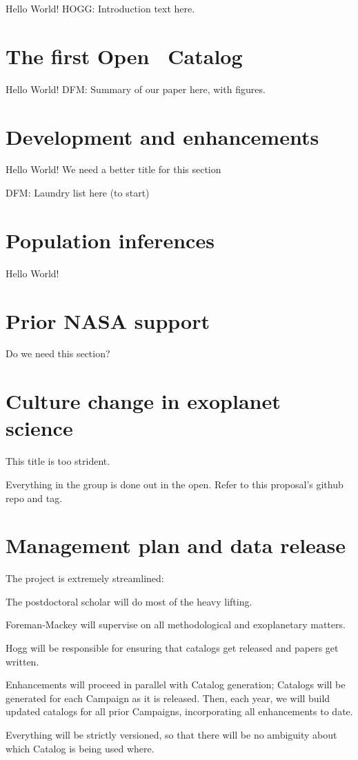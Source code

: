 \documentclass[12pt]{article}
\begin{document}
Hello World!  HOGG:  Introduction text here.

\section{The first Open \ketu\ Catalog}

Hello World!  DFM:  Summary of our paper here, with figures.

\section{Development and enhancements}

Hello World!  We need a better title for this section

DFM:  Laundry list here (to start)

\section{Population inferences}

Hello World!

\section{Prior NASA support}

Do we need this section?

\section{Culture change in exoplanet science}

This title is too strident.

Everything in the group is done out in the open.
Refer to this proposal's github repo and tag.

\section{Management plan and data release}

The project is extremely streamlined:

The postdoctoral scholar will do most of the heavy lifting.

Foreman-Mackey will supervise on all methodological and exoplanetary
matters.

Hogg will be responsible for ensuring that catalogs get released and
papers get written.

Enhancements will proceed in parallel with Catalog generation;
Catalogs will be generated for each Campaign as it is released.
Then, each year, we will build updated catalogs for all prior
Campaigns, incorporating all enhancements to date.

Everything will be strictly versioned, so that there will be no
ambiguity about which Catalog is being used where.
\end{document}
